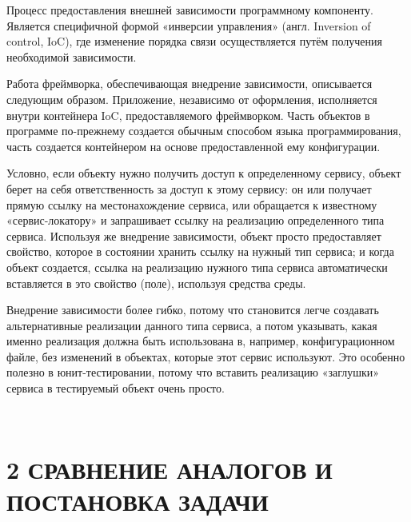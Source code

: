 \documentclass[14pt,a4paper]{extreport}
\begin{document}
	\parindent=1cm Процесс предоставления внешней зависимости программному компоненту. Является специфичной формой «инверсии управления» (англ. Inversion of control, IoC), где изменение порядка связи осуществляется путём получения необходимой зависимости.\par
	Работа фреймворка, обеспечивающая внедрение зависимости, описывается следующим образом. Приложение, независимо от оформления, исполняется внутри контейнера IoC, предоставляемого фреймворком. Часть объектов в программе по-прежнему создается обычным способом языка программирования, часть создается контейнером на основе предоставленной ему конфигурации.\par
	Условно, если объекту нужно получить доступ к определенному сервису, объект берет на себя ответственность за доступ к этому сервису: он или получает прямую ссылку на местонахождение сервиса, или обращается к известному «сервис-локатору» и запрашивает ссылку на реализацию определенного типа сервиса. Используя же внедрение зависимости, объект просто предоставляет свойство, которое в состоянии хранить ссылку на нужный тип сервиса; и когда объект создается, ссылка на реализацию нужного типа сервиса автоматически вставляется в это свойство (поле), используя средства среды.\par
	Внедрение зависимости более гибко, потому что становится легче создавать альтернативные реализации данного типа сервиса, а потом указывать, какая именно реализация должна быть использована в, например, конфигурационном файле, без изменений в объектах, которые этот сервис используют. Это особенно полезно в юнит-тестировании, потому что вставить реализацию «заглушки» сервиса в тестируемый объект очень просто.\par

	~\\


	
	\newpage
	\section*{\normalsize\hspace{4ex}2 СРАВНЕНИЕ АНАЛОГОВ И ПОСТАНОВКА ЗАДАЧИ}
\end{document}
